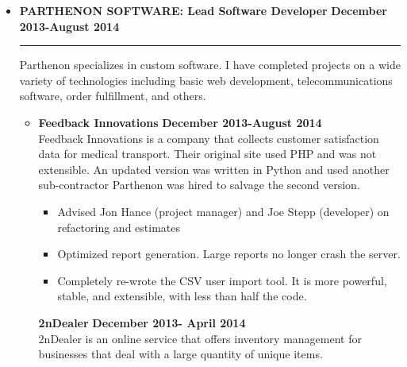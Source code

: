 \documentclass[overlapped]{res}
\begin{document}
\begin{resume}
\begin{itemize}[leftmargin=0in]
\begin{itemize}[leftmargin=0in]
\begin{samepage}
\begin{itemize}
                    \end{itemize}
                \end{samepage}
        \end{itemize}
        \vspace{0.125in}
    \item[] 
        \textbf{PARTHENON SOFTWARE: Lead Software Developer} \hfill \textbf{December 2013-August 2014} \\[-0.1in] \rule{\textwidth}{0.5pt}
        Parthenon specializes in custom software. I have completed projects on a wide variety of technologies including basic 
        web development, telecommunications software, order fulfillment, and others. \vspace{0.125in}
        \begin{itemize}[leftmargin=0in]
            \item[] 
                \begin{samepage}
                    \textbf{Feedback Innovations} \hfill \textbf{December 2013-August 2014} \\
                    Feedback Innovations is a company that collects customer satisfaction data for medical transport. Their original site 
                    used PHP and was not extensible.  An updated version was written in Python and used another sub-contractor Parthenon 
                    was hired to salvage the second version.
                    \begin{itemize}
                        \item[\textbullet] Advised Jon Hance (project manager) and Joe Stepp (developer) on refactoring and estimates
                        \item[\textbullet] Optimized report generation. Large reports no longer crash the server.
                        \item[\textbullet] Completely re-wrote the CSV user import tool. It is more powerful, stable, and extensible, with
                                           less than half the code.
                    \end{itemize}
                \end{samepage}
                \begin{samepage}
                    \textbf{2nDealer} \hfill \textbf{December 2013- April 2014} \\
                    2nDealer is an online service that offers inventory management for businesses that deal with a large quantity of unique items. 

\end{samepage}
\end{itemize}
\end{itemize}
\end{resume}
\end{document}
